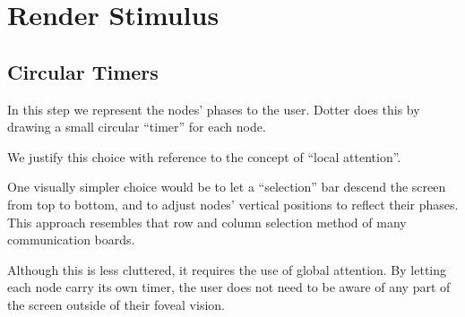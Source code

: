 \chapter{Render Stimulus}
\label{chap:render-stimulus}

\section{Circular Timers}
In this step we represent the nodes' phases to the user.
Dotter does this by drawing a small circular ``timer'' for each node.

We justify this choice with reference to the concept of ``local attention''.

One visually simpler choice would be to let a ``selection'' bar descend the screen from top to bottom,
and to adjust nodes' vertical positions to reflect their phases.
This approach resembles that row and column selection method of many communication boards.

Although this is less cluttered, it requires the use of global attention.
By letting each node carry its own timer, the user does not need to be aware of any part of the screen
outside of their foveal vision.
